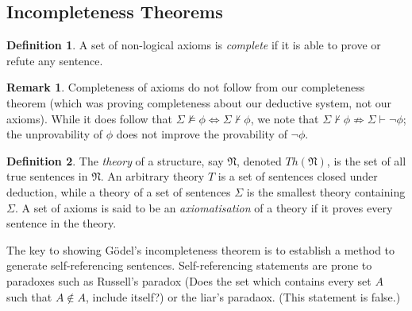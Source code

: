 \documentclass{article}
\theoremstyle{definition}
\newtheorem{defn}{Definition}[subsection]
\newtheorem{rmk}{Remark}[subsection]
\begin{document}
\subsection{Incompleteness Theorems}
\begin{defn}
	A set of non-logical axioms is \emph{complete} if it is able to prove or refute any sentence.
\end{defn}
\begin{rmk}
	Completeness of axioms do not follow from our completeness theorem (which was proving completeness about our deductive system, not our axioms). While it does follow that $\Sigma\not\models\phi\iff\Sigma\not\vdash\phi$, we note that $\Sigma\not\vdash\phi\not\Rightarrow\Sigma\vdash\neg\phi$; the unprovability of $\phi$ does not improve the provability of $\neg\phi$.
\end{rmk}
\begin{defn}
	The \emph{theory} of a structure, say $\mathfrak{N}$, denoted $Th(\mathfrak{N})$, is the set of all true sentences in $\mathfrak{N}$. An arbitrary theory $T$ is a set of sentences closed under deduction, while a theory of a set of sentences $\Sigma$ is the smallest theory containing $\Sigma$.
	A set of axioms is said to be an \emph{axiomatisation} of a theory if it proves every sentence in the theory.
\end{defn}
The key to showing G\"{o}del's incompleteness theorem is to establish a method to generate self-referencing sentences. Self-referencing statements are prone to paradoxes such as Russell's paradox (Does the set which contains every set $A$ such that $A\not\in A$, include itself?) or the liar's paradaox. (This statement is false.)
\end{document}
